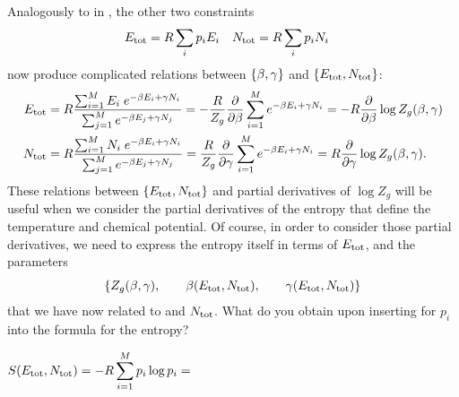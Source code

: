Analogously to  in , the other two constraints
\begin{align*}
  E_{\text{tot}} & = R \sum_i p_i E_i &
  N_{\text{tot}} & = R \sum_i p_i N_i
\end{align*}
now produce complicated relations between $\left\{\beta, \gamma\right\}$ and $\left\{E_{\text{tot}}, N_{\text{tot}}\right\}$:
\begin{align}
  E_{\text{tot}} & = R \frac{\sum_{i = 1}^M E_i \; e^{-\beta E_i + \gamma N_i}}{\sum_{j = 1}^M e^{-\beta E_j + \gamma N_j}} = -\frac{R}{Z_g} \frac{\partial }{\partial \beta} \sum_{i = 1}^M e^{-\beta E_i + \gamma N_i} = -R \frac{\partial }{\partial \beta} \log Z_g(\beta, \gamma) \label{eq:grand_be_deriv} \\
  N_{\text{tot}} & = R \frac{\sum_{i = 1}^M N_i \; e^{-\beta E_i + \gamma N_i}}{\sum_{j = 1}^M e^{-\beta E_j + \gamma N_j}} =  \frac{R}{Z_g} \frac{\partial }{\partial \gamma} \sum_{i = 1}^M e^{-\beta E_i + \gamma N_i} =  R \frac{\partial }{\partial \gamma} \log Z_g(\beta, \gamma). \label{eq:grand_ga_deriv}
\end{align}
These relations between $\left\{E_{\text{tot}}, N_{\text{tot}}\right\}$ and partial derivatives of $\log Z_g$ will be useful when we consider the partial derivatives of the entropy that define the temperature and chemical potential.
Of course, in order to consider those partial derivatives, we need to express the entropy itself in terms of $E_{\text{tot}}$, \Ntot and the parameters
\begin{equation*}
  \left\{Z_g(\beta, \gamma), \qquad \beta(E_{\text{tot}}, N_{\text{tot}}), \qquad \gamma(E_{\text{tot}}, N_{\text{tot}})\right\}
\end{equation*}
that we have now related to \Etot and $N_{\text{tot}}$.
What do you obtain upon inserting  for $p_i$ into the formula for the entropy?
\begin{mdframed}
  $\displaystyle S(E_{\text{tot}}, N_{\text{tot}}) = -R \sum_{i = 1}^M p_i \log p_i = $ \\[90 pt] %
\end{mdframed}

